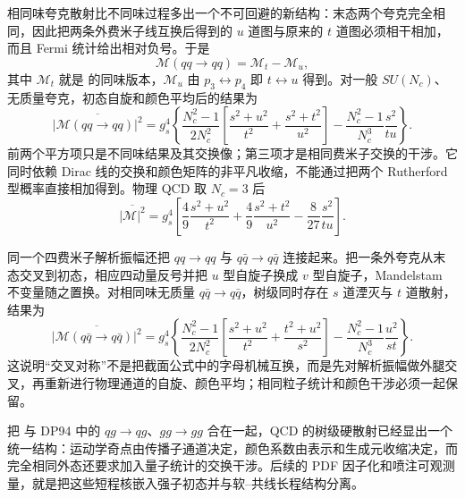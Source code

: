 相同味夸克散射比不同味过程多出一个不可回避的新结构：末态两个夸克完全相同，因此把两条外费米子线互换后得到的 $u$ 道图与原来的 $t$ 道图必须相干相加，而且 Fermi 统计给出相对负号。于是
\begin{equation}
\boxed{
\mathcal M(qq\to qq)=\mathcal M_t-\mathcal M_u,}
\label{eq:qcd-identical-qq-amplitude-dp95}
\end{equation}
其中 $\mathcal M_t$ 就是 的同味版本，$\mathcal M_u$ 由 $p_3\leftrightarrow p_4$ 即 $t\leftrightarrow u$ 得到。对一般 $SU(N_c)$、无质量夸克，初态自旋和颜色平均后的结果为
\begin{equation}
\boxed{
\overline{|\mathcal M(qq\to qq)|^2}
=g_s^4\left\{
\frac{N_c^2-1}{2N_c^2}
\left[\frac{s^2+u^2}{t^2}+\frac{s^2+t^2}{u^2}\right]
-\frac{N_c^2-1}{N_c^3}\frac{s^2}{tu}
\right\}.}
\label{eq:qcd-identical-qq-m2-dp95}
\end{equation}
前两个平方项只是不同味结果及其交换像；第三项才是相同费米子交换的干涉。它同时依赖 Dirac 线的交换和颜色矩阵的非平凡收缩，不能通过把两个 Rutherford 型概率直接相加得到。物理 QCD 取 $N_c=3$ 后
\begin{equation*}
\overline{|\mathcal M|^2}
=g_s^4\left[
\frac49\frac{s^2+u^2}{t^2}
+\frac49\frac{s^2+t^2}{u^2}
-\frac{8}{27}\frac{s^2}{tu}
\right].
\end{equation*}

同一个四费米子解析振幅还把 $qq\to qq$ 与 $q\bar q\to q\bar q$ 连接起来。把一条外夸克从末态交叉到初态，相应四动量反号并把 $u$ 型自旋子换成 $v$ 型自旋子，Mandelstam 不变量随之置换。对相同味无质量 $q\bar q\to q\bar q$，树级同时存在 $s$ 道湮灭与 $t$ 道散射，结果为
\begin{equation}
\boxed{
\overline{|\mathcal M(q\bar q\to q\bar q)|^2}
=g_s^4\left\{
\frac{N_c^2-1}{2N_c^2}
\left[\frac{s^2+u^2}{t^2}+\frac{t^2+u^2}{s^2}\right]
-\frac{N_c^2-1}{N_c^3}\frac{u^2}{st}
\right\}.}
\label{eq:qcd-identical-qqbar-m2-dp95}
\end{equation}
这说明“交叉对称”不是把截面公式中的字母机械互换，而是先对解析振幅做外腿交叉，再重新进行物理通道的自旋、颜色平均；相同粒子统计和颜色干涉必须一起保留。

把 与 DP94 中的 $qg\to qg$、$gg\to gg$ 合在一起，QCD 的树级硬散射已经显出一个统一结构：运动学奇点由传播子通道决定，颜色系数由表示和生成元收缩决定，而完全相同外态还要求加入量子统计的交换干涉。后续的 PDF 因子化和喷注可观测量，就是把这些短程核嵌入强子初态并与软--共线长程结构分离。
